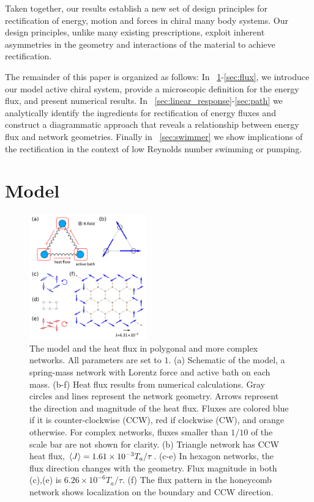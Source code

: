 \documentclass[
 preprint,
 preprintnumbers,
 amsmath,amssymb,
 aps,
 pre,
 longbibliography,
 superscriptaddress,
 10pt, twocolumn
]{revtex4-1}
\begin{document}
Taken together, our results establish a new set of design principles for rectification of energy, motion and forces in chiral many body systems. Our design principles, unlike many existing prescriptions, exploit inherent asymmetries in the geometry and interactions of the material to achieve rectification.

The remainder of this paper is organized as follows:
In \secname~\ref{sec:model}-\ref{sec:flux}, we introduce our model active chiral system, provide a microscopic definition for the energy flux, and present numerical results.
In \secname~\ref{sec:linear_response}-\ref{sec:path} we analytically identify the ingredients for rectification of energy fluxes and construct a diagrammatic approach that reveals a relationship between energy flux and network geometries.
Finally in \secname~\ref{sec:swimmer} we show implications of the rectification in the context of low Reynolds number swimming or pumping. %

\section{Model} \label{sec:model}

\begin{figure}[ht]
	\centering
	\includegraphics[width=0.45\textwidth]{1_model_and_result.pdf}
    \caption{The model and the heat flux in polygonal and more complex networks. All parameters are set to $1$.
    (a) Schematic of the model, a spring-mass network with Lorentz force and active bath on each mass.
    (b-f) Heat flux results from numerical calculations. Gray circles and lines represent the network geometry. Arrows represent the direction and magnitude of the heat flux. Fluxes are colored blue if it is counter-clockwise (CCW), red if clockwise (CW), and orange otherwise. For complex networks, fluxes smaller than $1/10$ of the scale bar are not shown for clarity.
    (b) Triangle network has CCW heat flux, $\expval{J}=1.61\times 10^{-3} T_a/\tau$.
    (c-e) In hexagon networks, the flux direction changes with the geometry. Flux magnitude in both (c),(e) is $6.26\times 10^{-6} T_a/\tau$.
    (f) The flux pattern in the honeycomb network shows localization on the boundary and CCW direction.
    }
    \label{fig:model_and_result}
\end{figure}
\end{document}
